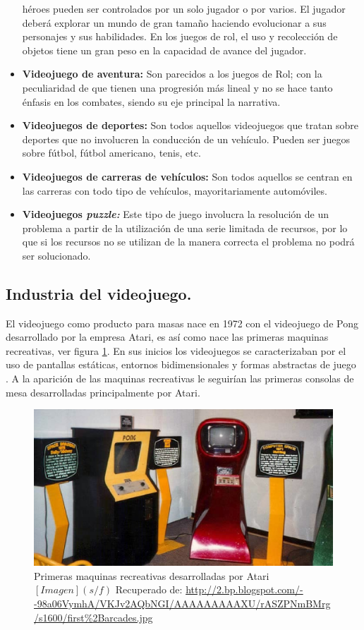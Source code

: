 \begin{itemize}
				héroes pueden ser controlados por un solo jugador o por varios. El 
				jugador deberá explorar un mundo de gran tamaño haciendo evolucionar a 
				sus personajes y sus habilidades. En los juegos de rol, el uso y 
				recolección de objetos tiene un gran peso en la capacidad de avance del 
				jugador.
				\item \textbf{Videojuego de aventura:} Son parecidos a los juegos de 
				Rol; con la peculiaridad de que tienen una progresión más lineal y no 
				se hace tanto énfasis en los combates, siendo su eje principal la 
				narrativa.
				\item \textbf{Videojuegos de deportes:} Son todos aquellos videojuegos 
				que tratan sobre deportes que no involucren la conducción de un 
				vehículo. Pueden ser juegos sobre fútbol, fútbol americano, tenis, etc.
				\item \textbf{Videojuegos de carreras de vehículos:} Son todos aquellos 
				se centran en las carreras con todo tipo de vehículos, mayoritariamente 
				automóviles.
				\item \textbf{Videojuegos {\it puzzle:}} Este tipo de juego involucra 
				la resolución de un problema a partir de la utilización de una serie 
				limitada de recursos, por lo que si los recursos no se utilizan de la 
				manera correcta el problema no podrá ser solucionado.  
			\end{itemize}
			
	\subsection{Industria del videojuego.}\label{IndusVideo}
	El videojuego como producto para masas nace en 1972 con el videojuego de Pong 
	desarrollado por la empresa Atari, es así como nace las primeras maquinas 
	recreativas, ver figura \ref{fig_MaquinaAtari}. En sus inicios los videojuegos se caracterizaban por el uso de 
	pantallas estáticas, entornos bidimensionales y formas abstractas de juego
	\cite{perez2010analisis}. A la aparición de las maquinas recreativas le seguirían 
	las primeras consolas de mesa desarrolladas principalmente por Atari. 
	\\
	\par

	\begin{figure}
					\centering
					\includegraphics[width=0.5 \textwidth]{03MarcoTeoricoA/imagenes/atari.eps}
					\caption{Primeras maquinas recreativas desarrolladas por Atari 
					$[Imagen] (s/f)$ Recuperado de: \url{http://2.bp.blogspot.com/--98a06VymhA/VKJv2AQbNGI/AAAAAAAAAXU/rASZPNmBMrg/s1600/first\%2Barcades.jpg} } 
					\label{fig_MaquinaAtari}
		\end{figure}	
	
